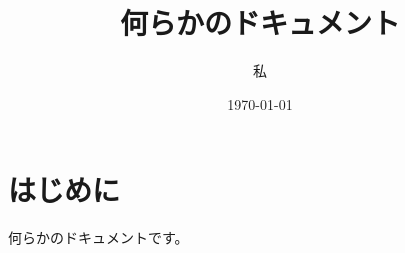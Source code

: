 \documentclass[uplatex,dvipdfmx,a4paper]{jsarticle}
\title{何らかのドキュメント}
\author{私}
\date{\today}
\begin{document}
\maketitle

\section{はじめに}

何らかのドキュメントです。
\end{document}
